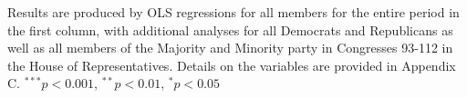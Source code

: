 \documentclass[12pt]{article}
\newcommand\fnote[1]{\captionsetup{font=normalsize}\caption*{#1}}
\begin{document}
\begin{table}[H]
\begin{threeparttable}
\begin{tabular}{l c c c c c }
\hline
\end{tabular}
\begin{tablenotes}
   \item
   Results are produced by OLS regressions for all members for the entire period in the first column, with additional analyses for all Democrats and Republicans as well as all members of the Majority and Minority party in Congresses 93-112 in the House of Representatives. Details on the variables are provided in Appendix C.
$^{***}p<0.001$, $^{**}p<0.01$, $^*p<0.05$
 \end{tablenotes}
\end{threeparttable}
\end{table}
\end{document}
